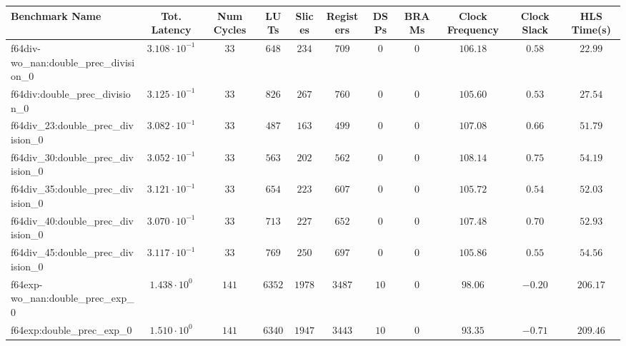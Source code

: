 \begin{tabular}{|l|c|c|c|c|c|c|c|c|c|c|}
\hline
Benchmark Name                                 & Tot. Latency            & Num Cycles & LUTs       & Slices    & Registers & DSPs    & BRAMs & Clock Frequency & Clock Slack & HLS Time(s) \\
\hline
f64div-wo\_nan:double\_prec\_division\_0       & $ 3.108 \cdot 10^{-1} $ & $ 33     $ & $ 648    $ & $ 234   $ & $ 709   $ & $ 0   $ & $ 0 $ & $ 106.18      $ & $ 0.58    $ & $ 22.99   $ \\
f64div:double\_prec\_division\_0               & $ 3.125 \cdot 10^{-1} $ & $ 33     $ & $ 826    $ & $ 267   $ & $ 760   $ & $ 0   $ & $ 0 $ & $ 105.60      $ & $ 0.53    $ & $ 27.54   $ \\
f64div\_23:double\_prec\_division\_0           & $ 3.082 \cdot 10^{-1} $ & $ 33     $ & $ 487    $ & $ 163   $ & $ 499   $ & $ 0   $ & $ 0 $ & $ 107.08      $ & $ 0.66    $ & $ 51.79   $ \\
f64div\_30:double\_prec\_division\_0           & $ 3.052 \cdot 10^{-1} $ & $ 33     $ & $ 563    $ & $ 202   $ & $ 562   $ & $ 0   $ & $ 0 $ & $ 108.14      $ & $ 0.75    $ & $ 54.19   $ \\
f64div\_35:double\_prec\_division\_0           & $ 3.121 \cdot 10^{-1} $ & $ 33     $ & $ 654    $ & $ 223   $ & $ 607   $ & $ 0   $ & $ 0 $ & $ 105.72      $ & $ 0.54    $ & $ 52.03   $ \\
f64div\_40:double\_prec\_division\_0           & $ 3.070 \cdot 10^{-1} $ & $ 33     $ & $ 713    $ & $ 227   $ & $ 652   $ & $ 0   $ & $ 0 $ & $ 107.48      $ & $ 0.70    $ & $ 52.93   $ \\
f64div\_45:double\_prec\_division\_0           & $ 3.117 \cdot 10^{-1} $ & $ 33     $ & $ 769    $ & $ 250   $ & $ 697   $ & $ 0   $ & $ 0 $ & $ 105.86      $ & $ 0.55    $ & $ 54.56   $ \\
f64exp-wo\_nan:double\_prec\_exp\_0            & $ 1.438 \cdot 10^{0}  $ & $ 141    $ & $ 6352   $ & $ 1978  $ & $ 3487  $ & $ 10  $ & $ 0 $ & $ 98.06       $ & $ -0.20   $ & $ 206.17  $ \\
f64exp:double\_prec\_exp\_0                    & $ 1.510 \cdot 10^{0}  $ & $ 141    $ & $ 6340   $ & $ 1947  $ & $ 3443  $ & $ 10  $ & $ 0 $ & $ 93.35       $ & $ -0.71   $ & $ 209.46  $ \\

\end{tabular}
